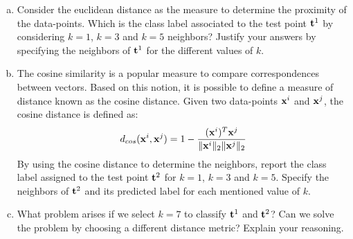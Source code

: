 \documentclass[11pt,a4paper]{article}
\begin{document}
\begin{enumerate}[(a)]
\item Consider the euclidean distance as the measure to determine the proximity of the data-points. Which is the class label associated to the test point ${\bf t}^1$ by considering $k=1$, $k=3$ and $k=5$ neighbors? Justify your answers by specifying the neighbors of ${\bf t}^1$ for the different values of $k$.
\item The cosine similarity is a popular measure to compare correspondences between vectors. Based on this notion, it is possible to define a measure of distance known as the cosine distance. Given two data-points ${\bf x}^i$ and ${\bf x}^j$, the cosine distance is defined as:
\begin{align*}
	d_{cos}({\bf x}^i,{\bf x}^j) = 1- \frac{({\bf x}^i)^T{\bf x}^j}{\|{\bf x}^i\|_2\|{\bf x}^j\|_2}
\end{align*}
By using the cosine distance to determine the neighbors, report the class label assigned to the test point ${\bf t}^2$ for $k=1$, $k=3$ and $k=5$. Specify the neighbors of ${\bf t}^2$ and its predicted label for each mentioned value of $k$.
\item What problem arises if we select $k=7$ to classify ${\bf t}^1$ and ${\bf t}^2$? Can we solve the problem by choosing a different distance metric? Explain your reasoning.

\end{enumerate}
\end{document}
